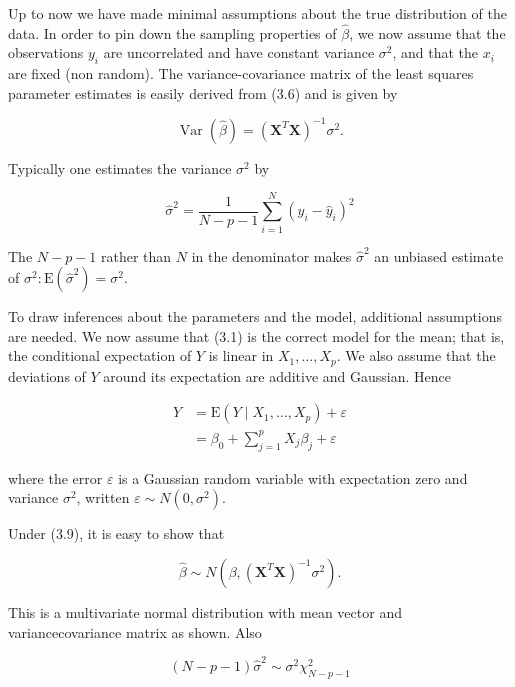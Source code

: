 \documentclass[10pt]{article}
\begin{document}
Up to now we have made minimal assumptions about the true distribution of the data. In order to pin down the sampling properties of $\hat{\beta}$, we now assume that the observations $y_{i}$ are uncorrelated and have constant variance $\sigma^{2}$, and that the $x_{i}$ are fixed (non random). The variance-covariance matrix of the least squares parameter estimates is easily derived from (3.6) and is given by


\begin{equation*}
\operatorname{Var}(\hat{\beta})=\left(\mathbf{X}^{T} \mathbf{X}\right)^{-1} \sigma^{2} . \tag{3.8}
\end{equation*}


Typically one estimates the variance $\sigma^{2}$ by

$$
\hat{\sigma}^{2}=\frac{1}{N-p-1} \sum_{i=1}^{N}\left(y_{i}-\hat{y}_{i}\right)^{2}
$$

The $N-p-1$ rather than $N$ in the denominator makes $\hat{\sigma}^{2}$ an unbiased estimate of $\sigma^{2}: \mathrm{E}\left(\hat{\sigma}^{2}\right)=\sigma^{2}$.

To draw inferences about the parameters and the model, additional assumptions are needed. We now assume that (3.1) is the correct model for the mean; that is, the conditional expectation of $Y$ is linear in $X_{1}, \ldots, X_{p}$. We also assume that the deviations of $Y$ around its expectation are additive and Gaussian. Hence


\begin{align*}
Y & =\mathrm{E}\left(Y \mid X_{1}, \ldots, X_{p}\right)+\varepsilon \\
& =\beta_{0}+\sum_{j=1}^{p} X_{j} \beta_{j}+\varepsilon \tag{3.9}
\end{align*}


where the error $\varepsilon$ is a Gaussian random variable with expectation zero and variance $\sigma^{2}$, written $\varepsilon \sim N\left(0, \sigma^{2}\right)$.

Under (3.9), it is easy to show that


\begin{equation*}
\hat{\beta} \sim N\left(\beta,\left(\mathbf{X}^{T} \mathbf{X}\right)^{-1} \sigma^{2}\right) . \tag{3.10}
\end{equation*}


This is a multivariate normal distribution with mean vector and variancecovariance matrix as shown. Also


\begin{equation*}
(N-p-1) \hat{\sigma}^{2} \sim \sigma^{2} \chi_{N-p-1}^{2} \tag{3.11}
\end{equation*}
\end{document}
